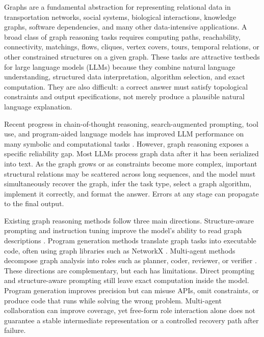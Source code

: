 \documentclass[pdflatex,iicol,sn-mathphys-num]{sn-jnl}
\theoremstyle{thmstyleone}
\theoremstyle{thmstyletwo}
\theoremstyle{thmstylethree}
\begin{document}
Graphs are a fundamental abstraction for representing relational data in transportation networks, social systems, biological interactions, knowledge graphs, software dependencies, and many other data-intensive applications. A broad class of graph reasoning tasks requires computing paths, reachability, connectivity, matchings, flows, cliques, vertex covers, tours, temporal relations, or other constrained structures on a given graph. These tasks are attractive testbeds for large language models (LLMs) because they combine natural language understanding, structured data interpretation, algorithm selection, and exact computation. They are also difficult: a correct answer must satisfy topological constraints and output specifications, not merely produce a plausible natural language explanation.

Recent progress in chain-of-thought reasoning, search-augmented prompting, tool use, and program-aided language models has improved LLM performance on many symbolic and computational tasks \cite{wei2022chain,wang2023selfconsistency,yao2023tree,besta2024graph,gao2023pal,yao2023react}. However, graph reasoning exposes a specific reliability gap. Most LLMs process graph data after it has been serialized into text. As the graph grows or as constraints become more complex, important structural relations may be scattered across long sequences, and the model must simultaneously recover the graph, infer the task type, select a graph algorithm, implement it correctly, and format the answer. Errors at any stage can propagate to the final output.

Existing graph reasoning methods follow three main directions. Structure-aware prompting and instruction tuning improve the model's ability to read graph descriptions \cite{tang2024graphgpt,chai2023graphllm,graphinstruct2024}. Program generation methods translate graph tasks into executable code, often using graph libraries such as NetworkX \cite{hagberg2008networkx,zhang2025gcoder}. Multi-agent methods decompose graph analysis into roles such as planner, coder, reviewer, or verifier \cite{li2024graphteam}. These directions are complementary, but each has limitations. Direct prompting and structure-aware prompting still leave exact computation inside the model. Program generation improves precision but can misuse APIs, omit constraints, or produce code that runs while solving the wrong problem. Multi-agent collaboration can improve coverage, yet free-form role interaction alone does not guarantee a stable intermediate representation or a controlled recovery path after failure.
\end{document}

